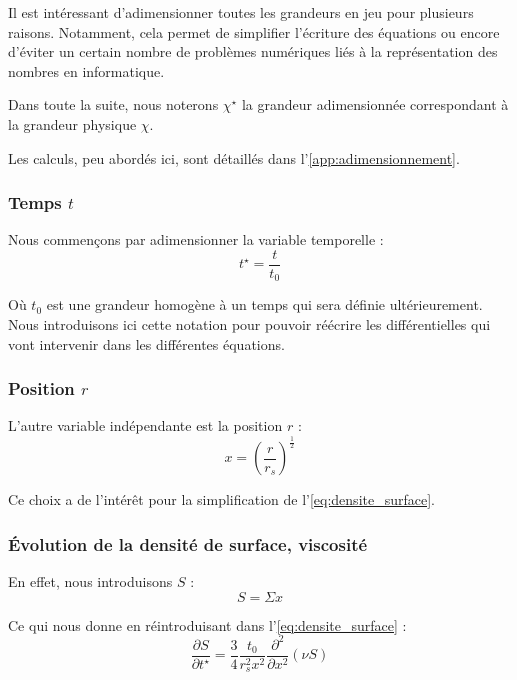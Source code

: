 Il est intéressant d’adimensionner toutes les grandeurs en jeu pour plusieurs
raisons. Notamment, cela permet de simplifier l’écriture des équations ou
encore d’éviter un certain nombre de problèmes numériques liés à la
représentation des nombres en informatique.

Dans toute la suite, nous noterons $\chi^\star$ la grandeur adimensionnée
correspondant à la grandeur physique $\chi$.

Les calculs, peu abordés ici, sont détaillés dans
l’\cref{app:adimensionnement}.

\subsubsection{\texorpdfstring{Temps $t$}{Temps t}}

Nous commençons par adimensionner la variable temporelle :
\begin{equation}
    t^\star = \frac{t}{t_0}
\end{equation}

Où $t_0$ est une grandeur homogène à un temps qui sera définie ultérieurement.
Nous introduisons ici cette notation pour pouvoir réécrire les différentielles
qui vont intervenir dans les différentes équations.

\subsubsection{\texorpdfstring{Position $r$}{Position r}}

L’autre variable indépendante est la position $r$ :
\begin{equation}
    \label{eq:position_adim}
    x = \left( \frac{r}{r_s} \right)^\frac{1}{2}
\end{equation}

Ce choix a de l’intérêt pour la simplification de l’\cref{eq:densite_surface}.

\subsubsection{Évolution de la densité de surface, viscosité}

En effet, nous introduisons $S$ :
\begin{equation}
    \label{eq:definition_S}
    S = \Sigma x
\end{equation}

Ce qui nous donne en réintroduisant dans l’\cref{eq:densite_surface} :
\begin{equation}
    \label{eq:rel_densite_surface}
    \frac{\partial S}{\partial t^\star} = \frac{3}{4} \frac{t_0}{r_s^2 x^2} \frac{\partial^2}{\partial x^2} \left(\nu S\right)
\end{equation}

